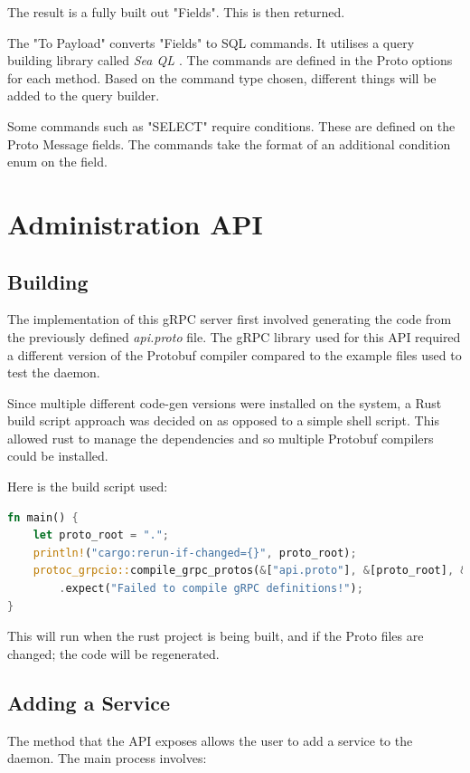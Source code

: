\documentclass[a4paper,12pt]{report}
\begin{document}
The result is a fully built out "Fields". This is then returned.

The "To Payload" converts "Fields" to SQL commands. It utilises a query building library called \textit{Sea QL \cite{sea}}. 
The commands are defined in the Proto options for each method. Based on the command type chosen, different things will be added to the query builder.

Some commands such as "SELECT" require conditions. These are defined on the Proto Message fields. The commands take the format of an additional condition enum on the field.

\section{Administration API}

\subsection{Building}

The implementation of this gRPC server first involved generating the code from the previously defined \textit{api.proto} file.
The gRPC library used for this API required a different version of the Protobuf compiler compared to the example files used to test the daemon.

Since multiple different code-gen versions were installed on the system, a Rust build script \cite{build} approach was decided on as opposed to a simple shell script. 
This allowed rust to manage the dependencies and so multiple Protobuf compilers could be installed. 

Here is the build script used:
\begin{lstlisting}[language=Rust]
fn main() {
    let proto_root = ".";
    println!("cargo:rerun-if-changed={}", proto_root);
    protoc_grpcio::compile_grpc_protos(&["api.proto"], &[proto_root], &proto_root, None)
        .expect("Failed to compile gRPC definitions!");
}
\end{lstlisting}
This will run when the rust project is being built, and if the Proto files are changed; the code will be regenerated.

\subsection{Adding a Service}
The method that the API exposes allows the user to add a service to the daemon. The main process involves:
\end{document}
